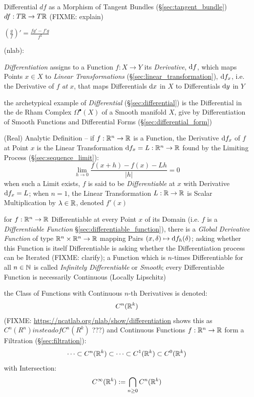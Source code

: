 {Differential $df$ as a Morphism of Tangent Bundles (\S\ref{sec:tangent_bundle})
$df : T\mathbb{R} \rightarrow T\mathbb{R}$ (FIXME: explain)

\asterism

$(\frac{g}{f})' = \frac{f g' - f' g}{f^2}$

\asterism

(nlab):

\emph{Differentiation} assigns to a Function $f : X \rightarrow Y$ its
\emph{Derivative}, $\mathrm{d}f$, which maps Points $x \in X$ to \emph{Linear
  Transformations} (\S\ref{sec:linear_transformation}), $\mathrm{d}f_x$, i.e. the
Derivative of $f$ \emph{at} $x$, that maps Differentials $\mathrm{d}x$ in $X$ to
Differentials $\mathrm{d}y$ in $Y$

\fist the archetypical example of \emph{Differential} (\S\ref{sec:differential})
is the Differential in the de Rham Complex $\Omega^\bullet(X)$ of a Smooth
manifold $X$, give by Differentiation of Smooth Functions and Differential Forms
(\S\ref{sec:differential_form})

(Real) Analytic Definition -- if $f : \mathbb{R}^n \rightarrow \mathbb{R}$ is a
Function, the Derivative $\mathrm{d}f_x$ of $f$ at Point $x$ is the Linear
Transformation $\mathrm{d}f_x = L : \mathbb{R}^n \rightarrow \mathbb{R}$ found by the
Limiting Process (\S\ref{sec:sequence_limit}):
\[
  \lim_{h\rightarrow{0}} \frac{f(x + h) - f(x) - Lh}{|h|} = 0
\]
when such a Limit exists, $f$ is said to be \emph{Differentiable} at $x$ with
Derivative $\mathrm{d}f_x = L$; when $n=1$, the Linear Transformation $L : \mathbb{R}
\rightarrow \mathbb{R}$ is Scalar Multiplication by $\lambda \in \mathbb{R}$, denoted
$f'(x)$

for $f : \mathbb{R}^n \rightarrow \mathbb{R}$ Differentiable at every Point $x$ of its
Domain (i.e. $f$ is a \emph{Differentiable Function}
\S\ref{sec:differentiable_function}), there is a \emph{Global Derivative
  Function} of type $\mathbb{R}^n \times \mathbb{R}^n \rightarrow \mathbb{R}$ mapping Pairs
$(x,\delta) \mapsto \mathrm{d}f_h(\delta)$; asking whether this Function is itself
Differentiable is asking whether the Differentiation process can be Iterated
(FIXME: clarify); a Function which is $n$-times Differentiable for all $n \in
\mathbb{N}$ is called \emph{Infinitely Differentiable} or \emph{Smooth}; every
Differentiable Function is necessarily Continuous (Locally Lipschitz)

the Class of Functions with Continuous $n$-th Derivatives is denoted:
\[
  C^n(\mathbb{R}^k)
\]
(FIXME: \url{https://ncatlab.org/nlab/show/differentiation} shows this as
$C^n(R^n) instead of C^n(R^k)$ ???)
and Continuous Functions $f : \mathbb{R}^n \rightarrow \mathbb{R}$ form a Filtration
(\S\ref{sec:filtration}):
\[
  \cdots \subset C^n(\mathbb{R}^k) \subset \cdots \subset C^1(\mathbb{R}^k) \subset
    C^0(\mathbb{R}^k)
\]
with Intersection:
\[
  C^\infty(\mathbb{R}^k) := \bigcap_{n\geq{0}} C^n(\mathbb{R}^k)
\]

}
